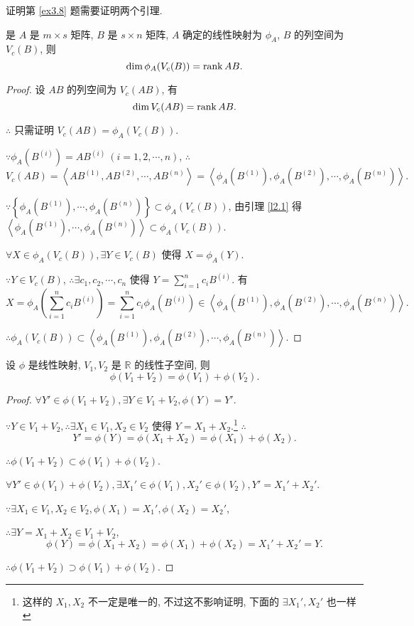 \documentclass{ctexart}
\begin{document}
证明第 \ref{ex3.8} 题需要证明两个引理.
\begin{lemma}\label{l2.3}
    是 $A$ 是 $m\times s$ 矩阵, $B$ 是 $s\times n$ 矩阵, $A$ 确定的线性映射为 $\phi_A$, $B$ 的列空间为 $V_c(B)$, 则
    \[\dim\phi_A(V_c(B))=\operatorname{rank} AB.\]
\end{lemma}
\begin{proof}
    设 $AB$ 的列空间为 $V_c(AB)$, 有
    \[\dim V_c(AB)=\operatorname{rank} AB.\]

    $\therefore$ 只需证明 $V_c(AB)=\phi_A(V_c(B))$.

    $\because\phi_A(B^{(i)})=AB^{(i)}\ (i=1,2,\cdots,n)$, $\therefore$
    \[V_c(AB)=\left<AB^{(1)},AB^{(2)},\cdots,AB^{(n)}\right>=\left<\phi_A(B^{(1)}),\phi_A(B^{(2)}),\cdots,\phi_A(B^{(n)})\right>.\]

    $\because\left\{\phi_A(B^{(1)}),\cdots,\phi_A(B^{(n)})\right\}\subset\phi_A(V_c(B))$, 由引理 \ref{l2.1} 得 $\left<\phi_A(B^{(1)}),\cdots,\phi_A(B^{(n)})\right>\subset\phi_A(V_c(B))$.

    $\forall X\in\phi_A(V_c(B)),\exists Y\in V_c(B)$ 使得 $X=\phi_A(Y)$.
    
    $\because Y\in V_c(B)$, $\therefore\exists c_1,c_2,\cdots,c_n$ 使得 $Y=\sum\limits_{i=1}^nc_iB^{(i)}$. 有
    \[X=\phi_A\left(\sum\limits_{i=1}^nc_iB^{(i)}\right)=\sum\limits_{i=1}^nc_i\phi_A(B^{(i)})\in\left<\phi_A(B^{(1)}),\phi_A(B^{(2)}),\cdots,\phi_A(B^{(n)})\right>.\]

    $\therefore\phi_A(V_c(B))\subset\left<\phi_A(B^{(1)}),\phi_A(B^{(2)}),\cdots,\phi_A(B^{(n)})\right>$.
\end{proof}
\begin{lemma}\label{l2.4}
    设 $\phi$ 是线性映射, $V_1,V_2$ 是 $\mathbb{R}$ 的线性子空间, 则
    \[\phi(V_1+V_2)=\phi(V_1)+\phi(V_2).\]
\end{lemma}
\begin{proof}
    $\forall Y'\in\phi(V_1+V_2),\exists Y\in V_1+V_2,\phi(Y)=Y'$.

    $\because Y\in V_1+V_2,\therefore\exists X_1\in V_1,X_2\in V_2$ 使得 $Y=X_1+X_2$.\footnote{这样的 $X_1,X_2$ 不一定是唯一的, 不过这不影响证明, 下面的 $\exists X_1',X_2'$ 也一样} $\therefore$
    \[Y'=\phi(Y)=\phi(X_1+X_2)=\phi(X_1)+\phi(X_2).\]

    $\therefore\phi(V_1+V_2)\subset\phi(V_1)+\phi(V_2)$.

    $\forall Y'\in\phi(V_1)+\phi(V_2),\exists X_1'\in\phi(V_1),X_2'\in\phi(V_2),Y'=X_1'+X_2'$.

    $\because\exists X_1\in V_1,X_2\in V_2,\phi(X_1)=X_1',\phi(X_2)=X_2'$,

    $\therefore\exists Y=X_1+X_2\in V_1+V_2$,
    \[\phi(Y)=\phi(X_1+X_2)=\phi(X_1)+\phi(X_2)=X_1'+X_2'=Y.\]

    $\therefore\phi(V_1+V_2)\supset\phi(V_1)+\phi(V_2)$.
\end{proof}
\end{document}
